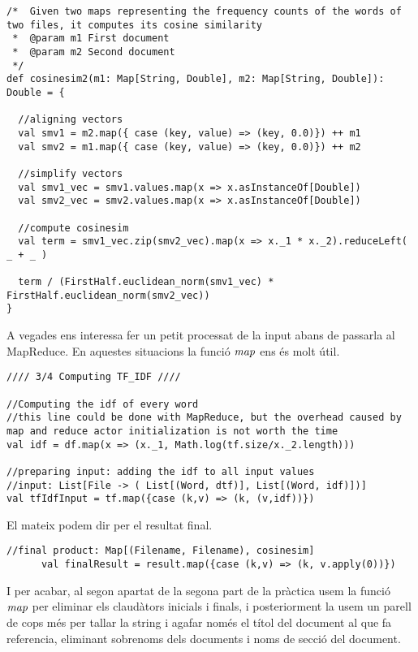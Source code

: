 \documentclass{report}
\begin{document}
\begin{lstlisting}[style=scalaHighlight]
/*	Given two maps representing the frequency counts of the words of two files, it computes its cosine similarity
 * 	@param m1 First document
 * 	@param m2 Second document
 */
def cosinesim2(m1: Map[String, Double], m2: Map[String, Double]): Double = {

  //aligning vectors
  val smv1 = m2.map({ case (key, value) => (key, 0.0)}) ++ m1
  val smv2 = m1.map({ case (key, value) => (key, 0.0)}) ++ m2

  //simplify vectors
  val smv1_vec = smv1.values.map(x => x.asInstanceOf[Double])
  val smv2_vec = smv2.values.map(x => x.asInstanceOf[Double])

  //compute cosinesim
  val term = smv1_vec.zip(smv2_vec).map(x => x._1 * x._2).reduceLeft( _ + _ )

  term / (FirstHalf.euclidean_norm(smv1_vec) * FirstHalf.euclidean_norm(smv2_vec))
}
\end{lstlisting}

A vegades ens interessa fer un petit processat de la input abans de passar\-la al MapReduce. En aquestes situacions la funció $ \emph{map} $ ens és molt útil.

\begin{lstlisting}[style=scalaHighlight]
//// 3/4 Computing TF_IDF ////

//Computing the idf of every word
//this line could be done with MapReduce, but the overhead caused by map and reduce actor initialization is not worth the time
val idf = df.map(x => (x._1, Math.log(tf.size/x._2.length)))

//preparing input: adding the idf to all input values
//input: List[File -> ( List[(Word, dtf)], List[(Word, idf)])]
val tfIdfInput = tf.map({case (k,v) => (k, (v,idf))})

\end{lstlisting}

El mateix podem dir per el resultat final.

\begin{lstlisting}[style=scalaHighlight]
//final product: Map[(Filename, Filename), cosinesim]
      val finalResult = result.map({case (k,v) => (k, v.apply(0))})
\end{lstlisting}

I per acabar, al segon apartat de la segona part de la pràctica usem la funció $ \emph{map} $ per eliminar els claudàtors inicials i finals, i posteriorment la usem un parell de cops més per tallar la string i agafar només el títol del document al que fa referencia, eliminant sobrenoms dels documents i noms de secció del document.
\end{document}
